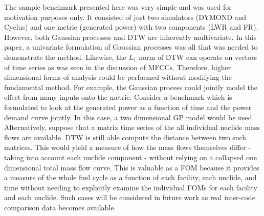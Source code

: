 The sample benchmark presented here was very simple and was used for motivation 
purposes only. It consisted of just
two simulators (DYMOND and Cyclus) and one metric (generated power) with
two components (LWR and FR).  However, both Gaussian processes and DTW
are inherently multivariate. In this paper, a univariate formulation of 
Gaussian processes was all that was needed to demonstrate the method. 
Likewise,
the $L_1$ norm of DTW can operate on vectors of time series as was seen 
in the discussion of MFCCs. Therefore, higher dimensional forms of analysis could 
be performed without modifying the fundamental method. For example, the Gaussian process could jointly model the 
effect from many inputs onto the metric. Consider a benchmark which is formulated
to look at the generated power as a function of time and the power demand curve
jointly.
In this case, a two dimensional GP model would be used. Alternatively, 
suppose that a matrix time series of the all individual nuclide mass flows 
are available. DTW is still able compute the distance between two 
such matrices. This would yield a measure of how the mass flows themselves
differ - taking into account each nuclide component - without relying on a 
collapsed one dimensional total mass flow curve. 
This is valuable as a FOM because it provides a measure of the whole fuel
cycle as a function of each facility, each nuclide, and time 
without needing to explicitly examine the individual FOMs for each facility 
and each nuclide.
Such cases will be considered in
future work as real inter-code comparison data becomes available.

